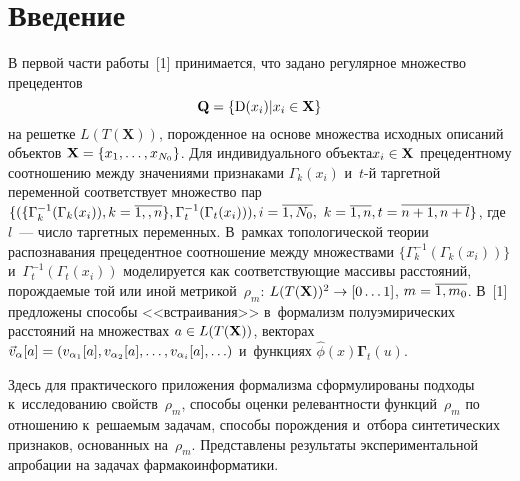 
  
\vspace*{-1pt}



\thispagestyle{headings}

\begin{multicols}{2}

\label{st\stat}

\section{Введение}

     В первой части работы~[1] принимается, что задано регулярное 
множество прецедентов 
$$
\mathbf{Q}\hm= \{\mathrm{D}(x_i)\vert x_i\in 
\mathbf{X}\}
$$ 
на решетке $L(T(\mathbf{X}))$, по\-рож\-ден\-ное на основе 
множества исходных описаний объектов $\mathbf{X}\hm= \{ x_1, \ldots , 
x_{N_0}\}$. Для индивидуального объекта\linebreak $x_i\hm\in \mathbf{X}$ 
прецедентному соотношению между значениями признаками 
$\Gamma_k(x_i)$ и~\mbox{$t$-й} таргетной переменной соответствует множество пар 
$\{(\{\Gamma_k^{-1}(\Gamma_k(x_i)),\linebreak k\hm=\overline{1, ,n}\}, \Gamma_t^{-1}(\Gamma_t(x_i))), i\hm=\overline{1,N_0},\
 k\hm=\overline{1,n},\linebreak t\hm=\overline{n+1, n+l}\}$, где $l$~--- 
число таргетных переменных. В~рамках топологической теории 
распознавания прецедентное соотношение между множествами $\{ 
\Gamma_k^{-1}(\Gamma_k(x_i))\}$ и~$\Gamma_t^{-1}(\Gamma_t(x_i))$ 
моделируется как со\-от\-вет\-ст\-ву\-ющие массивы расстояний, по\-рож\-да\-емые той 
или иной мет\-ри\-кой~$\rho_m$: $L(T(\mathbf{X}))^2\hm\to [0\ldots 1]$, 
$m\hm= \overline{1, m_0}$. В~[1] предложены способы <<встра\-и\-ва\-ния>> 
в~формализм полуэмирических рас\-сто\-яний на множествах $a\hm\in 
L(T(\mathbf{X}))$, векторах $\vec{v}_\alpha [a] \hm= ( v_{\alpha_1}[a], 
v_{\alpha_2}[a], \ldots , v_{\alpha_i}[a],\ldots)$ и~функциях 
$\hat{\phi}(x)\bm{\Gamma}_t(u)$. 
     
     Здесь для практического приложения формализма сформулированы 
подходы к~исследованию свойств~$\rho_m$, способы оценки релевантности 
функций~$\rho_m$ по отношению к~решаемым задачам, способы 
порождения и~отбора синтетических признаков, основанных на~$\rho_m$. 
Представлены результаты экспериментальной апробации на задачах 
фармакоинформатики.
     

\end{multicols}
